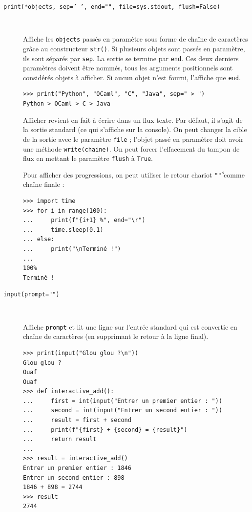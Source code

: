 \documentclass[a4paper, 10pt]{article}
\begin{document}
\begin{description}
    \item[\texttt{print(*objects, sep=' ', end="\n", file=sys.stdout, flush=False)}]~
    
    Affiche les \texttt{objects} passés en paramètre sous forme de chaîne de caractères grâce au constructeur \texttt{str()}. Si plusieurs objets sont passés en paramètre, ils sont séparés par \texttt{sep}. La sortie se termine par \texttt{end}. Ces deux derniers paramètres doivent être nommés, tous les arguments positionnels sont considérés objets à afficher. Si aucun objet n'est fourni, l'affiche que \texttt{end}.
    
    \begin{verbatim}
>>> print("Python", "OCaml", "C", "Java", sep=" > ")
Python > OCaml > C > Java
    \end{verbatim}
    
    Afficher revient en fait à écrire dans un flux texte. Par défaut, il s'agit de la sortie standard (ce qui s'affiche sur la console). On peut changer la cible de la sortie avec le paramètre \texttt{file} ; l'objet passé en paramètre doit avoir une méthode \texttt{write(chaine)}. On peut forcer l'effacement du tampon de flux en mettant le paramètre \texttt{flush} à \texttt{True}.\medskip

    Pour afficher des progressions, on peut utiliser le retour chariot \texttt{"\r"} comme chaîne finale :

    \begin{verbatim}
>>> import time
>>> for i in range(100):
...     print(f"{i+1} %", end="\r")
...     time.sleep(0.1)
... else:
...     print("\nTerminé !")
...
100%
Terminé !
    \end{verbatim}

    \item[\texttt{input(prompt="")}]~ 
    
    Affiche \texttt{prompt} et lit une ligne sur l'entrée standard qui est convertie en chaîne de caractères (en supprimant le retour à la ligne final).

    \begin{verbatim}
>>> print(input("Glou glou ?\n"))
Glou glou ?
Ouaf
Ouaf
>>> def interactive_add():
...     first = int(input("Entrer un premier entier : "))
...     second = int(input("Entrer un second entier : "))
...     result = first + second
...     print(f"{first} + {second} = {result}")
...     return result
...
>>> result = interactive_add()
Entrer un premier entier : 1846
Entrer un second entier : 898
1846 + 898 = 2744
>>> result
2744
    \end{verbatim}

\end{description}
\end{document}
